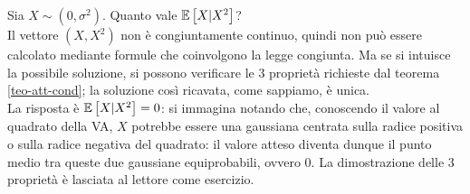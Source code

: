 \begin{ese}
  Sia $X \sim (0, \sigma^2)$. Quanto vale $\mathbb E \left[ X|X^2 \right]$? \\
  Il vettore $(X,X^2)$ non è congiuntamente continuo, quindi non può essere calcolato mediante formule che coinvolgono la legge congiunta. Ma se si intuisce la possibile soluzione, si possono verificare le 3 proprietà richieste dal teorema \ref{teo-att-cond}; la soluzione così ricavata, come sappiamo, è unica. \\
  La risposta è $\mathbb E \left[ X|X^2 \right] = 0$: si immagina notando che, conoscendo il valore al quadrato della VA, $X$ potrebbe essere una gaussiana centrata sulla radice positiva o sulla radice negativa del quadrato: il valore atteso diventa dunque il punto medio tra queste due gaussiane equiprobabili, ovvero $0$. La dimostrazione delle 3 proprietà è lasciata al lettore come esercizio.
\end{ese}

